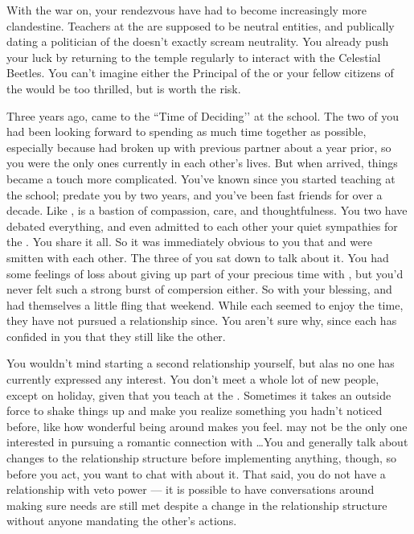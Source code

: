 \documentclass[char]{GL2020}
\begin{document}
With the war on, your rendezvous have had to become increasingly more clandestine. Teachers at the \pSchool{} are supposed to be neutral entities, and publically dating a politician of the \pShip{} doesn’t exactly scream neutrality. You already push your luck by returning to the temple regularly to interact with the Celestial Beetles. You can’t imagine either the Principal of the \pSc{} or your fellow citizens of the \pTech{} would be too thrilled, but \cJuniorStatesman{} is worth the risk. 

Three years ago, \cJuniorStatesman{} came to the ``Time of Deciding’’ at the school. The two of you had been looking forward to spending as much time together as possible, especially because \cJuniorStatesman{} had broken up with \cJuniorStatesman{\their} previous partner about a year prior, so you were the only ones currently in each other’s lives. But when \cJuniorStatesman{\they} arrived, things became a touch more complicated. You’ve known \cEthics{\intro} since you started teaching at the school; \cEthics{\they} predate\cEthics{\verbs} you by two years, and you’ve been fast friends for over a decade. Like \cMusic{}, \cEthics{} is a bastion of compassion, care, and thoughtfulness. You two have debated everything, and even admitted to each other your quiet sympathies for the \pShippies{}. You share it all. So it was immediately obvious to you that \cJuniorStatesman{} and \cEthics{} were smitten with each other. The three of you sat down to talk about it. You had some feelings of loss about giving up part of your precious time with \cJuniorStatesman{}, but you’d never felt such a strong burst of compersion either. So with your blessing, \cJuniorStatesman{} and \cBeetle{} had themselves a little fling that weekend. While each seemed to enjoy the time, they have not pursued a relationship since. You aren’t sure why, since each has confided in you that they still like the other.

You wouldn't mind starting a second relationship yourself, but alas no one has currently expressed any interest. You don't meet a whole lot of new people, except on holiday, given that you teach at the \pSc{}. Sometimes it takes an outside force to shake things up and make you realize something you hadn’t noticed before, like how wonderful being around \cEthics{} makes you feel. \cJuniorStatesman{} may not be the only one interested in pursuing a romantic connection with \cEthics{}\ldots You and \cJuniorStatesman{} generally talk about changes to the relationship structure before implementing anything, though, so before you act, you want to chat with \cJuniorStatesman{} about it. That said, you do not have a relationship with veto power — it is possible to have conversations around making sure needs are still met despite a change in the relationship structure without anyone mandating the other's actions.
\end{document}
